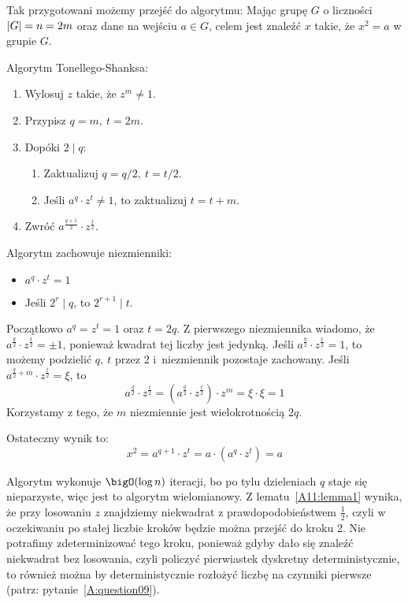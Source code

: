 Tak przygotowani możemy przejść do algorytmu: Mając grupę \( G \) o liczności \( \left\lvert G\right\rvert = n = 2m \) oraz dane na wejściu \( a \in G \), celem jest znaleźć \( x \) takie, że \( x^2 = a \) w grupie \( G \).
\begin{greyframe}
    Algorytm Tonellego-Shanksa:
    \begin{enumerate}
        \item Wylosuj \( z \) takie, że \( z^m \neq 1 \).
        \item Przypisz \( q = m, \ t = 2m \).
        \item Dopóki \( 2 \mid q \):
        \begin{enumerate}
            \item Zaktualizuj \( q = q / 2, \ t = t / 2 \).
            \item Jeśli \( a^q \cdot z^t \neq 1 \), to zaktualizuj \( t = t + m \).
        \end{enumerate}
        \item Zwróć \( a^{\frac{q+1}{2}} \cdot z^{\frac{t}{2}} \).
    \end{enumerate}
\end{greyframe}
Algorytm zachowuje niezmienniki:
\begin{itemize}
    \item \( a^q \cdot z^t = 1 \)
    \item Jeśli \( 2^r \mid q \), to \( 2^{r+1} \mid t \).
\end{itemize}
Początkowo \(a^q = z^t = 1 \) oraz \( t = 2q \).
Z pierwszego niezmiennika wiadomo, że \( a^{\frac{q}{2}} \cdot z^{\frac{t}{2}} = \pm 1 \), ponieważ kwadrat tej liczby jest jedynką.
Jeśli \( a^{\frac{q}{2}} \cdot z^{\frac{t}{2}} = 1 \), to możemy podzielić \( q, \ t \) przez 2 i~niezmiennik pozostaje zachowany.
Jeśli \( a^{\frac{q}{2} + m} \cdot z^{\frac{t}{2}} = \xi \), to
\[
    a^{\frac{q}{2}} \cdot z^{\frac{t}{2}} = (a^{\frac{q}{2}} \cdot z^{\frac{t}{2}}) \cdot z^m = \xi \cdot \xi = 1
\]
Korzystamy z tego, że \( m \) niezmiennie jest wielokrotnością \( 2q \).

Ostateczny wynik to:
\[
    x^2 = a^{q+1} \cdot z^t = a \cdot (a^q \cdot z^t) = a
\]

Algorytm wykonuje \( \bigO(\log n) \) iteracji, bo po tylu dzieleniach \( q \) staje się nieparzyste, więc jest to algorytm wielomianowy.
Z lematu~\ref{A11:lemma1} wynika, że przy losowaniu \( z \) znajdziemy niekwadrat z prawdopodobieństwem \( \frac{1}{2} \), czyli w oczekiwaniu po stałej liczbie kroków będzie można przejść do kroku 2.
Nie potrafimy zdeterminizować tego kroku, ponieważ gdyby dało się znaleźć niekwadrat bez losowania, czyli policzyć pierwiastek dyskretny deterministycznie, to również można by deterministycznie rozłożyć liczbę na czynniki pierwsze (patrz: pytanie~\ref{A:question09}).